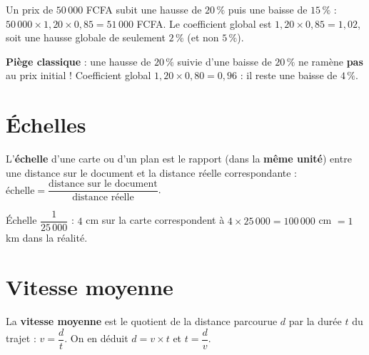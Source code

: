 \begin{exemple}
Un prix de $50\,000$ FCFA subit une hausse de $20\,\%$ puis une baisse de $15\,\%$ :
$50\,000\times1{,}20\times0{,}85=51\,000$ FCFA. Le coefficient global est
$1{,}20\times0{,}85=1{,}02$, soit une hausse globale de seulement $2\,\%$ (et non $5\,\%$).
\end{exemple}

\begin{remarque}
\textbf{Piège classique} : une hausse de $20\,\%$ suivie d'une baisse de $20\,\%$ ne ramène
\textbf{pas} au prix initial ! Coefficient global $1{,}20\times0{,}80=0{,}96$ : il reste une
baisse de $4\,\%$.
\end{remarque}

\section{Échelles}

\begin{definition}[Échelle]
L'\textbf{échelle} d'une carte ou d'un plan est le rapport (dans la \textbf{même unité}) entre
une distance sur le document et la distance réelle correspondante :
$\text{échelle}=\dfrac{\text{distance sur le document}}{\text{distance réelle}}$.
\end{definition}

\begin{illus}
\end{illus}

\begin{exemple}
Échelle $\dfrac1{25\,000}$ : $4$ cm sur la carte correspondent à
$4\times25\,000=100\,000$ cm $=1$ km dans la réalité.
\end{exemple}

\section{Vitesse moyenne}

\begin{definition}
La \textbf{vitesse moyenne} est le quotient de la distance parcourue $d$ par la durée $t$
du trajet : $v=\dfrac dt$. On en déduit $d=v\times t$ et $t=\dfrac dv$.
\end{definition}

